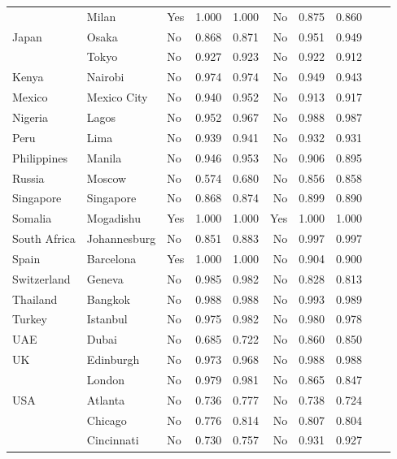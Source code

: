 \begin{tabular}{ l l l r r r l r r r }
          & Milan &      Yes &  1.000 &  1.000 &       No &  0.875 &  0.860 \\
Japan & Osaka &       No &  0.868 &  0.871 &       No &  0.951 &  0.949 \\
          & Tokyo &       No &  0.927 &  0.923 &       No &  0.922 &  0.912 \\
Kenya & Nairobi &       No &  0.974 &  0.974 &       No &  0.949 &  0.943 \\
Mexico & Mexico City &       No &  0.940 &  0.952 &       No &  0.913 &  0.917 \\
Nigeria & Lagos &       No &  0.952 &  0.967 &       No &  0.988 &  0.987 \\
Peru & Lima &       No &  0.939 &  0.941 &       No &  0.932 &  0.931 \\
Philippines & Manila &       No &  0.946 &  0.953 &       No &  0.906 &  0.895 \\
Russia & Moscow &       No &  0.574 &  0.680 &       No &  0.856 &  0.858 \\
Singapore & Singapore &       No &  0.868 &  0.874 &       No &  0.899 &  0.890 \\
Somalia & Mogadishu &      Yes &  1.000 &  1.000 &      Yes &  1.000 &  1.000 \\
South Africa & Johannesburg &       No &  0.851 &  0.883 &       No &  0.997 &  0.997 \\
Spain & Barcelona &      Yes &  1.000 &  1.000 &       No &  0.904 &  0.900 \\
Switzerland & Geneva &       No &  0.985 &  0.982 &       No &  0.828 &  0.813 \\
Thailand & Bangkok &       No &  0.988 &  0.988 &       No &  0.993 &  0.989 \\
Turkey & Istanbul &       No &  0.975 &  0.982 &       No &  0.980 &  0.978 \\
UAE & Dubai &       No &  0.685 &  0.722 &       No &  0.860 &  0.850 \\
UK & Edinburgh &       No &  0.973 &  0.968 &       No &  0.988 &  0.988 \\
          & London &       No &  0.979 &  0.981 &       No &  0.865 &  0.847 \\
USA & Atlanta &       No &  0.736 &  0.777 &       No &  0.738 &  0.724 \\
          & Chicago &       No &  0.776 &  0.814 &       No &  0.807 &  0.804 \\
          & Cincinnati &       No &  0.730 &  0.757 &       No &  0.931 &  0.927 \\

\end{tabular}
